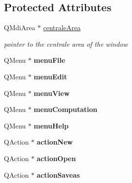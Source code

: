 \subsection*{\-Protected \-Attributes}
\begin{DoxyCompactItemize}
\item 
\hypertarget{class_main_window_af5df9378db57a148236d639dd928d08f}{\-Q\-Mdi\-Area $\ast$ \hyperlink{class_main_window_af5df9378db57a148236d639dd928d08f}{centrale\-Area}}\label{class_main_window_af5df9378db57a148236d639dd928d08f}

\begin{DoxyCompactList}\small\item\em pointer to the centrale area of the window \end{DoxyCompactList}\item 
\hypertarget{class_main_window_a2ca04227e7d71b036ccd0ed4176a5561}{\-Q\-Menu $\ast$ {\bfseries menu\-File}}\label{class_main_window_a2ca04227e7d71b036ccd0ed4176a5561}

\item 
\hypertarget{class_main_window_a51ec7fcfcb60073b395dee46daacf1f9}{\-Q\-Menu $\ast$ {\bfseries menu\-Edit}}\label{class_main_window_a51ec7fcfcb60073b395dee46daacf1f9}

\item 
\hypertarget{class_main_window_a57793b17cc2b8de42b5b10e9458ae9cb}{\-Q\-Menu $\ast$ {\bfseries menu\-View}}\label{class_main_window_a57793b17cc2b8de42b5b10e9458ae9cb}

\item 
\hypertarget{class_main_window_a8142152915924723cee2f22e0868a852}{\-Q\-Menu $\ast$ {\bfseries menu\-Computation}}\label{class_main_window_a8142152915924723cee2f22e0868a852}

\item 
\hypertarget{class_main_window_a81d80bba8e8a31cea2bb218094890c81}{\-Q\-Menu $\ast$ {\bfseries menu\-Help}}\label{class_main_window_a81d80bba8e8a31cea2bb218094890c81}

\item 
\hypertarget{class_main_window_afcc4de380e40fe4aeb61b07402f00f58}{\-Q\-Action $\ast$ {\bfseries action\-New}}\label{class_main_window_afcc4de380e40fe4aeb61b07402f00f58}

\item 
\hypertarget{class_main_window_ab5342d85523e2dad5b6f69a6ad01ece3}{\-Q\-Action $\ast$ {\bfseries action\-Open}}\label{class_main_window_ab5342d85523e2dad5b6f69a6ad01ece3}

\item 
\hypertarget{class_main_window_ac785bdaae348156fc94fdfea23f67a90}{\-Q\-Action $\ast$ {\bfseries action\-Saveas}}\label{class_main_window_ac785bdaae348156fc94fdfea23f67a90}


\end{DoxyCompactItemize}
